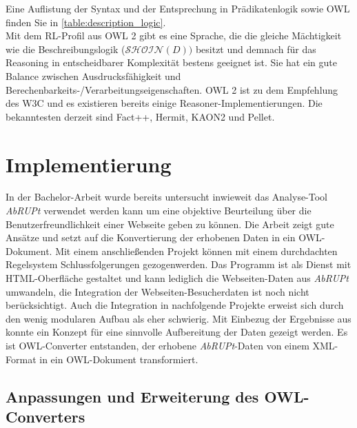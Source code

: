 \documentclass[runningheads,a4paper]{llncs}
\begin{document}
Eine Auflistung der Syntax und der Entsprechung in Prädikatenlogik sowie OWL finden Sie in \ref{table:description_logic}.
\\
Mit dem RL-Profil aus OWL 2 \cite{owl2rl} gibt es eine Sprache, die die gleiche Mächtigkeit wie die Beschreibungslogik (\(\mathcal{SHOIN}(D))\) besitzt und demnach für das Reasoning in entscheidbarer Komplexität bestens geeignet ist.
Sie hat ein gute Balance zwischen Ausdrucksfähigkeit und Berechenbarkeits-/Verarbeitungseigenschaften.
OWL 2 ist zu dem Empfehlung des W3C und es existieren bereits einige Reasoner-Implementierungen. 
Die bekanntesten derzeit sind Fact++, Hermit, KAON2 und Pellet.


\section{Implementierung}

In der Bachelor-Arbeit \cite{Brieger} wurde bereits untersucht inwieweit das Analyse-Tool \textit{AbRUPt} \cite{url_abrupt} verwendet werden kann um eine objektive Beurteilung über die Benutzerfreundlichkeit einer Webseite geben zu können. 
Die Arbeit zeigt gute Ansätze und setzt auf die Konvertierung der erhobenen Daten in ein OWL-Dokument. 
Mit einem anschließenden Projekt können mit einem durchdachten Regelsystem Schlussfolgerungen gezogenwerden. 
Das Programm ist als Dienst mit HTML-Oberfläche gestaltet und kann lediglich die Webseiten-Daten aus \textit{AbRUPt} umwandeln, die Integration der Webseiten-Besucherdaten ist noch nicht berücksichtigt. 
Auch die Integration in nachfolgende Projekte erweist sich durch den wenig modularen Aufbau als eher schwierig. 
Mit Einbezug der Ergebnisse aus \cite{Martin} konnte ein Konzept für eine sinnvolle Aufbereitung der Daten gezeigt werden. 
Es ist OWL-Converter entstanden, der erhobene \textit{AbRUPt}-Daten von einem XML-Format in ein OWL-Dokument transformiert.

\subsection{Anpassungen und Erweiterung des OWL-Converters}
\end{document}
